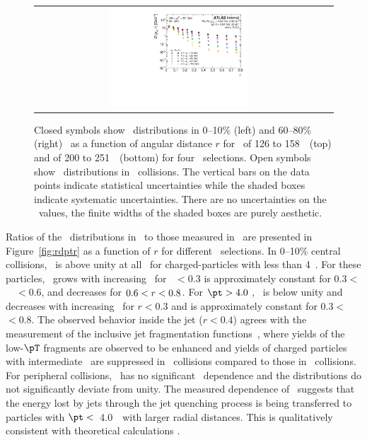 \begin{figure}[h]
{\begin{tabular}{cc}
            \includegraphics[width=0.5\textwidth]{figures/results/ChPS_final_dR_CONF_DpT_data_jet9_cent5.pdf} \\
      \end{tabular}
      }
\caption{Closed symbols show \Dptr\ distributions in 0--10\% (left) and 60--80\% (right) \pbpb\ as a function of angular distance $r$ for \ptjet\ of 126 to 158~\GeV\ (top) and of 200 to 251~\GeV\ (bottom) for four \pt\ selections. Open symbols show \Dptr\ distributions in \pp\ collisions.  The vertical bars on the data points indicate statistical uncertainties while the shaded boxes indicate systematic uncertainties. There are no uncertainties on the \rvar\ values, the finite widths of the shaded boxes are purely aesthetic.}
\label{fig:dptr}
\end{figure}


Ratios of the \Dptr\ distributions in \pbpb\ to those measured in \pp\ are presented in Figure~\ref{fig:rdptr} as a function of $r$ for different \pt\ selections. In 0--10\% central collisions, 
\RDptr\ is above unity at all \rvar\ for charged-particles with \pT less than 4~\GeV.
For these particles, 
\RDptr\  grows with increasing \rvar\ for \rvar\ $ < 0.3$ is approximately constant for \mbox{$ 0.3 <$ \rvar\ $< 0.6 $}, and decreases for \mbox{$0.6 < \mbox{$r$} < 0.8$}.  For $\pt > 4.0$ \GeV, \RDptr\ is below unity and decreases with increasing \rvar\ for $r < 0.3$ and is approximately constant for \mbox{$ 0.3 <$ \rvar\ $< 0.8 $}.  The observed behavior inside the jet ($r < 0.4$) agrees with the measurement of the inclusive jet fragmentation functions~\cite{Aaboud:2017eww, PhysRevC.98.024908}, where yields of the low-$\pT$ fragments are observed to be enhanced and yields of charged particles with intermediate \pT\ are suppressed in \PbPb\ collisions compared to those in \pp\ collisions. 
For peripheral collisions, \RDptr\ has no significant \rvar\ dependence and the distributions do not significantly deviate from unity. %
The measured dependence of \RDptr\ suggests that the energy lost by jets through the jet quenching process is being transferred to particles with $\pt <$~4.0~\GeV\ with larger radial distances. This is qualitatively consistent with theoretical calculations \mbox{\cite{Qin:2015srf,Blaizot:2014ula}}.


